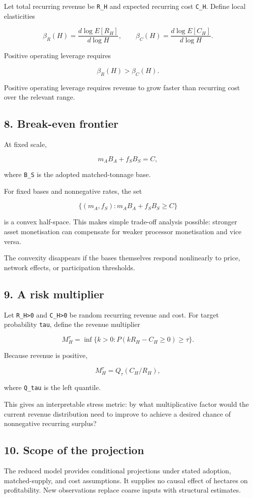 Let total recurring revenue be \texttt{R\_H} and expected recurring cost \texttt{C\_H}. Define
local elasticities

\[
\beta_R(H)=\frac{d\log E[R_H]}{d\log H},\qquad
\beta_C(H)=\frac{d\log E[C_H]}{d\log H}.
\]

Positive operating leverage requires

\[
\beta_R(H)>\beta_C(H).
\]

Positive operating leverage requires revenue to grow faster than recurring cost
over the relevant range.

\subsection{8. Break-even frontier}\label{break-even-frontier}

At fixed scale,

\[
m_AB_A+f_SB_S=C,
\]

where \texttt{B\_S} is the adopted matched-tonnage base.

For fixed bases and nonnegative rates, the set

\[
\{(m_A,f_S):m_AB_A+f_SB_S\ge C\}
\]

is a convex half-space. This makes simple trade-off analysis possible: stronger
asset monetisation can compensate for weaker processor monetisation and vice
versa.

The convexity disappears if the bases themselves respond nonlinearly to price,
network effects, or participation thresholds.

\subsection{9. A risk multiplier}\label{a-risk-multiplier}

Let \texttt{R\_H\textgreater{}0} and \texttt{C\_H\textgreater{}0} be random recurring revenue and cost. For target
probability \texttt{tau}, define the revenue multiplier

\[
M_H^\tau=\inf\{k>0:P(kR_H-C_H\ge0)\ge\tau\}.
\]

Because revenue is positive,

\[
M_H^\tau=Q_\tau(C_H/R_H),
\]

where \texttt{Q\_tau} is the left quantile.

This gives an interpretable stress metric: by what multiplicative factor would
the current revenue distribution need to improve to achieve a desired chance of
nonnegative recurring surplus?

\subsection{10. Scope of the projection}\label{scope-of-the-projection}

The reduced model provides conditional projections under stated adoption,
matched-supply, and cost assumptions. It supplies no causal effect of hectares on
profitability. New observations replace coarse inputs with structural estimates.
